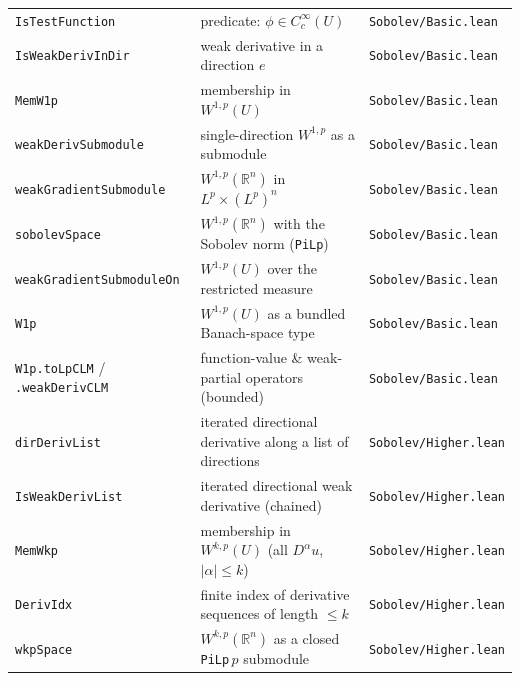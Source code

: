 ﻿\documentclass[12pt, a4paper]{article}
\renewcommand{\_}{\origunderscore\allowbreak}
\theoremstyle{definition}
\theoremstyle{plain}
\begin{document}
\begin{longtable}{@{}L{4.5cm}L{6.8cm}L{3.5cm}@{}}
  \texttt{IsTestFunction}           & predicate: $\phi \in C^\infty_c(U)$                 & \texttt{Sobolev/\allowbreak Basic.\allowbreak lean} \\
  \texttt{IsWeakDerivInDir}         & weak derivative in a direction $e$                  & \texttt{Sobolev/\allowbreak Basic.\allowbreak lean} \\
  \texttt{MemW1p}                   & membership in $W^{1,p}(U)$                           & \texttt{Sobolev/\allowbreak Basic.\allowbreak lean} \\
  \texttt{weakDerivSubmodule}       & single-direction $W^{1,p}$ as a submodule           & \texttt{Sobolev/\allowbreak Basic.\allowbreak lean} \\
  \texttt{weakGradientSubmodule}    & $W^{1,p}(\mathbb{R}^n)$ in $L^p\!\times\!(L^p)^n$    & \texttt{Sobolev/\allowbreak Basic.\allowbreak lean} \\
  \texttt{sobolevSpace}             & $W^{1,p}(\mathbb{R}^n)$ with the Sobolev norm (\texttt{PiLp}) & \texttt{Sobolev/\allowbreak Basic.\allowbreak lean} \\
  \texttt{weakGradientSubmoduleOn}  & $W^{1,p}(U)$ over the restricted measure            & \texttt{Sobolev/\allowbreak Basic.\allowbreak lean} \\
  \texttt{W1p}                      & $W^{1,p}(U)$ as a bundled Banach-space type         & \texttt{Sobolev/\allowbreak Basic.\allowbreak lean} \\
  \texttt{W1p.toLpCLM} / \texttt{.weakDerivCLM} & function-value \& weak-partial operators (bounded) & \texttt{Sobolev/\allowbreak Basic.\allowbreak lean} \\
  \texttt{dirDerivList}             & iterated directional derivative along a list of directions & \texttt{Sobolev/\allowbreak Higher.\allowbreak lean} \\
  \texttt{IsWeakDerivList}          & iterated directional weak derivative (chained)      & \texttt{Sobolev/\allowbreak Higher.\allowbreak lean} \\
  \texttt{MemWkp}                   & membership in $W^{k,p}(U)$ (all $D^\alpha u$, $|\alpha|\le k$) & \texttt{Sobolev/\allowbreak Higher.\allowbreak lean} \\
  \texttt{DerivIdx}                 & finite index of derivative sequences of length $\le k$ & \texttt{Sobolev/\allowbreak Higher.\allowbreak lean} \\
  \texttt{wkpSpace}                 & $W^{k,p}(\mathbb{R}^n)$ as a closed \texttt{PiLp}\,$p$ submodule & \texttt{Sobolev/\allowbreak Higher.\allowbreak lean} \\

\end{longtable}
\end{document}

